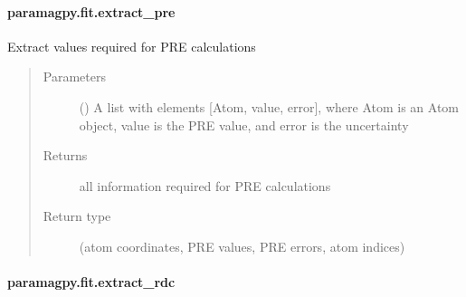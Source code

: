 \documentclass[a4paper,10pt,english]{sphinxmanual}
\begin{document}
\paragraph{paramagpy.fit.extract\_pre}
\label{\detokenize{reference/generated/paramagpy.fit.extract_pre:paramagpy-fit-extract-pre}}\label{\detokenize{reference/generated/paramagpy.fit.extract_pre::doc}}

\begin{fulllineitems}
\label{\detokenize{reference/generated/paramagpy.fit.extract_pre:paramagpy.fit.extract_pre}}
Extract values required for PRE calculations
\begin{quote}\begin{description}
\item[{Parameters}] \leavevmode
{} () \textendash{} A list with elements {[}Atom, value, error{]}, where Atom is
an Atom object, value is the PRE value, and error is the uncertainty

\item[{Returns}] \leavevmode
{} \textendash{} all information required for PRE calculations

\item[{Return type}] \leavevmode
(atom coordinates, PRE values, PRE errors, atom indices)

\end{description}\end{quote}

\end{fulllineitems}



\paragraph{paramagpy.fit.extract\_rdc}
\label{\detokenize{reference/generated/paramagpy.fit.extract_rdc:paramagpy-fit-extract-rdc}}\label{\detokenize{reference/generated/paramagpy.fit.extract_rdc::doc}}
\end{document}
